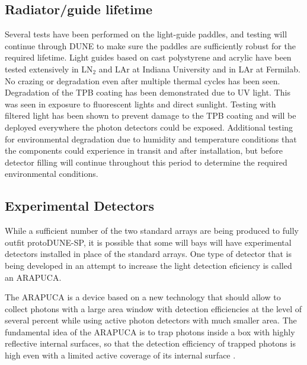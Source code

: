 \subsection{Radiator/guide lifetime}
Several tests have been performed on the light-guide paddles, and testing will 
continue through DUNE to make sure the paddles are sufficiently robust for the
required lifetime.
Light guides based on cast polystyrene and acrylic have been tested 
extensively in LN$_2$ and LAr at Indiana University and in LAr at Fermilab.
No crazing or degradation even after multiple thermal cycles has been seen.
Degradation of the TPB coating has been demonstrated due to UV light.
This was seen in exposure to fluorescent lights and direct sunlight.
Testing with filtered light %
has been shown to prevent damage
to the TPB coating and will be deployed everywhere the photon detectors
could be exposed.
Additional testing for environmental degradation due to humidity and 
temperature conditions that the components could experience in transit and 
after installation, but before detector filling will continue throughout this
period to determine the required environmental conditions.

\subsection{Experimental Detectors}
While a sufficient number of the two standard arrays are being produced to
fully outfit protoDUNE-SP, it is possible that some will bays will have 
experimental detectors installed in place of the standard arrays.  
One type of detector that is being developed in an attempt to increase the
light detection eficiency is called an ARAPUCA.

The ARAPUCA is a device based on a new technology that should allow to collect photons with a large area window with detection efficiencies at the level of several percent 
while using active photon detectors with much smaller area.
The fundamental idea of the ARAPUCA is to trap photons inside a box with highly reflective internal surfaces, so that the detection efficiency of trapped photons is high even with a 
limited active coverage of its internal surface \cite{arapuca_jinst}.\\

